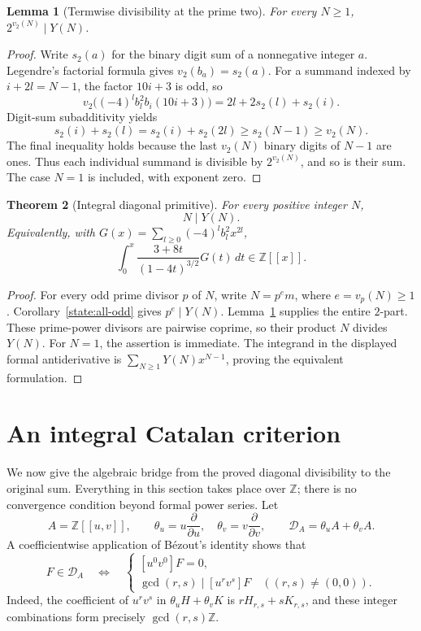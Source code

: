 \documentclass[11pt,a4paper]{article}
\newtheorem{theorem}{Theorem}[section]
\newtheorem{lemma}[theorem]{Lemma}
\theoremstyle{remark}\newtheorem{remark}[theorem]{Remark}
\newcommand{\Z}{\mathbb Z}\newcommand{\Q}{\mathbb Q}
\begin{document}
\begin{lemma}[Termwise divisibility at the prime two]\label{diag:two}
For every \(N\ge1\), \(2^{v_2(N)}\mid Y(N)\).
\end{lemma}
\begin{proof}
Write \(s_2(a)\) for the binary digit sum of a nonnegative integer \(a\).
Legendre's factorial formula gives \(v_2(b_a)=s_2(a)\).
For a summand indexed by \(i+2l=N-1\), the factor \(10i+3\) is odd, so
\[
 v_2\bigl((-4)^l b_l^2b_i(10i+3)\bigr)
                         =2l+2s_2(l)+s_2(i).
\]
Digit-sum subadditivity yields
\[
 s_2(i)+s_2(l)=s_2(i)+s_2(2l)
                     \ge s_2(N-1)\ge v_2(N).
\]
The final inequality holds because the last \(v_2(N)\) binary digits
of \(N-1\) are ones. Thus each individual summand is divisible by
\(2^{v_2(N)}\), and so is their sum. The case \(N=1\) is included,
with exponent zero.
\end{proof}

\begin{theorem}[Integral diagonal primitive]\label{diag:complete}
For every positive integer \(N\),
\[
                                \boxed{N\mid Y(N)}.
\]
Equivalently, with
\(G(x)=\sum_{l\ge0}(-4)^l b_l^2x^{2l}\),
\[
 \int_0^x\frac{3+8t}{(1-4t)^{3/2}}G(t)\,dt\in\Z[[x]].
\]
\end{theorem}
\begin{proof}
For every odd prime divisor \(p\) of \(N\), write
\(N=p^em\), where \(e=v_p(N)\ge1\).
Corollary~\ref{state:all-odd} gives \(p^e\mid Y(N)\).
Lemma~\ref{diag:two} supplies the entire \(2\)-part.
These prime-power divisors are pairwise coprime, so their product \(N\)
divides \(Y(N)\). For \(N=1\), the assertion is immediate.
The integrand in the displayed formal antiderivative is
\(\sum_{N\ge1}Y(N)x^{N-1}\), proving the equivalent formulation.
\end{proof}


\section{An integral Catalan criterion}\label{sec:catalan}

We now give the algebraic bridge from the proved diagonal divisibility
to the original sum. Everything in this section takes place over
\(\Z\); there is no convergence condition beyond formal power series.
Let
\[
 A=\Z[[u,v]],\qquad
 \theta_u=u\frac{\partial}{\partial u},\quad
 \theta_v=v\frac{\partial}{\partial v},\qquad
 \mathcal D_A=\theta_u A+\theta_v A.
\]
A coefficientwise application of B\'ezout's identity shows that
\begin{equation}\label{eq:bezout}
 F\in\mathcal D_A
 \quad\Longleftrightarrow\quad
 \begin{cases}
 [u^0v^0]F=0,\\
 \gcd(r,s)\mid[u^rv^s]F\quad((r,s)\ne(0,0)).
 \end{cases}
\end{equation}
Indeed, the coefficient of \(u^rv^s\) in \(\theta_u H+\theta_v K\)
is \(rH_{r,s}+sK_{r,s}\), and these integer combinations form precisely
\(\gcd(r,s)\Z\).
\end{document}
